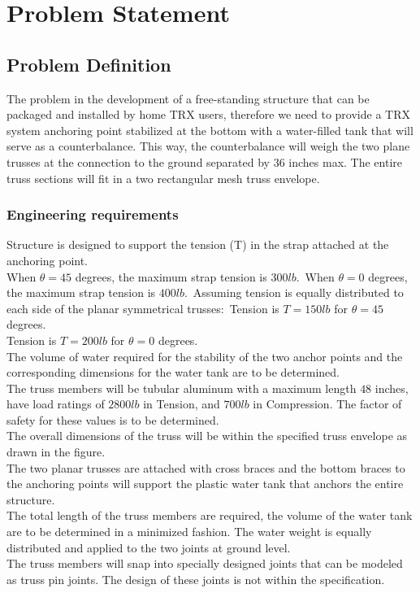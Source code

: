 \chapter{Problem Statement}
\section{Problem Definition}
The problem in the development of a free-standing structure that can be packaged and installed by home TRX users, therefore we need to provide a TRX system anchoring point stabilized at the bottom with a water-filled tank that will serve as a counterbalance. This way, the counterbalance will weigh the two plane trusses at the connection to the ground separated by $36$ inches max. The entire truss sections will fit in a two rectangular mesh truss envelope.\\
\subsection{Engineering requirements}
Structure is designed to support the tension (T) in the strap attached at the anchoring point.\\
When $ \theta = 45$ degrees, the maximum strap tension is $300 lb$.\
When $ \theta = 0$ degrees, the maximum strap tension is $400 lb$.\
Assuming tension is equally distributed to each side of the planar symmetrical trusses:\
Tension is $T = 150 lb$ for $ \theta = 45$ degrees.\\
Tension is $T = 200 lb$ for $ \theta = 0$ degrees.\\
The volume of water required for the stability of the two anchor points and the corresponding dimensions for the water tank are to be determined. \\
The truss members will be tubular aluminum with a maximum length $48$ inches, have load ratings of $2800 lb$ in Tension, and $700 lb$ in Compression. The factor of safety for these values is to be determined.\\
The overall dimensions of the truss will be within the specified truss envelope as drawn in the figure.\\
The two planar trusses are attached with cross braces and the bottom braces to the anchoring points will support the plastic water tank that anchors the entire structure.\\
The total length of the truss members are required, the volume of the water tank are to be determined in a minimized fashion. The water weight is equally distributed and applied to the two joints at ground level.\\
The truss members will snap into specially designed joints that can be modeled as truss pin joints. The design of these joints is not within the specification.\\
